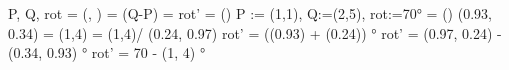 P, Q, rot
 = (, )
 = (Q-P)
 = 
rot' = (\cdot{})
P := (1,1), Q:=(2,5), rot:=70°
 = () \doteq (0.93, 0.34)
 = (1,4)
 = (1,4)/ \doteq (0.24, 0.97)
rot' = ((0.93) + (0.24)) °
rot' = (0.97, 0.24) - (0.34, 0.93) °
rot' = 70 - (1, 4) °